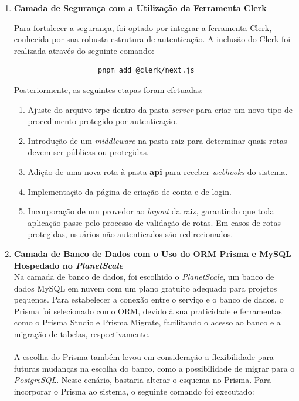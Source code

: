\begin{enumerate}
    \item\textbf{Camada de Segurança com a Utilização da Ferramenta Clerk}
    
    Para fortalecer a segurança, foi optado por integrar a ferramenta Clerk, conhecida por sua robusta estrutura de autenticação. A inclusão do Clerk foi realizada através do seguinte comando:
    
        \begin{verbatim}
                    pnpm add @clerk/next.js
        \end{verbatim}
    Posteriormente, as seguintes etapas foram efetuadas:
        \begin{enumerate}
            \item Ajuste do arquivo trpc dentro da pasta \textit{server} para criar um novo tipo de procedimento protegido por autenticação.
            \item Introdução de um \textit{middleware} na pasta raiz para determinar quais rotas devem ser públicas ou protegidas.
            \item Adição de uma nova rota à pasta \textbf{api}
            para receber \textit{webhooks} do sistema.
            \item Implementação da página de criação de conta e de login.
            \item Incorporação de um provedor ao \textit{layout} da raiz, garantindo que toda aplicação passe pelo processo de validação de rotas. Em casos de rotas protegidas, usuários não autenticados são redirecionados.
        \end{enumerate}
    
    \item\textbf{Camada de Banco de Dados com o Uso do ORM Prisma e MySQL Hospedado no \textit{PlanetScale}}\\
    
    Na camada de banco de dados, foi escolhido o \textit{PlanetScale}, um banco de dados MySQL em nuvem com um plano gratuito adequado para projetos pequenos. Para estabelecer a conexão entre o serviço e o banco de dados, o Prisma foi selecionado como ORM, devido à sua praticidade e ferramentas como o Prisma Studio e Prisma Migrate, facilitando o acesso ao banco e a migração de tabelas, respectivamente.\\\\
    A escolha do Prisma também levou em consideração a flexibilidade para futuras mudanças na escolha do banco, como a possibilidade de migrar para o \textit{PostgreSQL}. Nesse cenário, bastaria alterar o esquema no Prisma. Para incorporar o Prisma ao sistema, o seguinte comando foi executado:


\end{enumerate}
